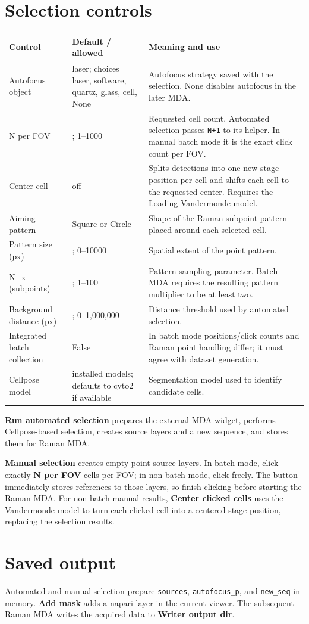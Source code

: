 \documentclass[11pt,oneside]{report}
\makeatletter
\newcommand{\ui}[1]{\textbf{#1}}
\newcommand{\code}[1]{\texttt{#1}}
\newcommand{\fieldtable}{\begin{longtable}{@{}>{\raggedright\arraybackslash}p{0.25\textwidth}>{\raggedright\arraybackslash}p{0.18\textwidth}>{\raggedright\arraybackslash}p{0.50\textwidth}@{}}\toprule\textbf{Control} & \textbf{Default / allowed} & \textbf{Meaning and use}\\\midrule\endhead}
\newcommand{\endfieldtable}{\bottomrule\end{longtable}}
\makeatother
\begin{document}
\section{Selection controls}
\fieldtable
Autofocus object & laser; choices laser, software, quartz, glass, cell, None &
Autofocus strategy saved with the selection. None disables autofocus in the later MDA.\\
N per FOV & 6; 1--1000 & Requested cell count. Automated selection passes
\code{N+1} to its helper. In manual batch mode it is the exact click count per FOV.\\
Center cell & off & Splits detections into one new stage position per cell and shifts
each cell to the requested center. Requires the Loading Vandermonde model.\\
Aiming pattern & Square or Circle & Shape of the Raman subpoint pattern placed around
each selected cell.\\
Pattern size (px) & 30; 0--10000 & Spatial extent of the point pattern.\\
N\_x (subpoints) & 1; 1--100 & Pattern sampling parameter. Batch MDA requires the
resulting pattern multiplier to be at least two.\\
Background distance (px) & 80; 0--1,000,000 & Distance threshold used by automated selection.\\
Integrated batch collection & False & In batch mode positions/click counts and Raman
point handling differ; it must agree with dataset generation.\\
Cellpose model & installed models; defaults to cyto2 if available & Segmentation model
used to identify candidate cells.\\
\endfieldtable

\ui{Run automated selection} prepares the external MDA widget, performs Cellpose-based
selection, creates source layers and a new sequence, and stores them for Raman MDA.

\ui{Manual selection} creates empty point-source layers. In batch mode, click exactly
\ui{N per FOV} cells per FOV; in non-batch mode, click freely. The button immediately
stores references to those layers, so finish clicking before starting the Raman MDA.
For non-batch manual results, \ui{Center clicked cells} uses the Vandermonde model to
turn each clicked cell into a centered stage position, replacing the selection results.

\section*{Saved output}
Automated and manual selection prepare \code{sources}, \code{autofocus\_p}, and
\code{new\_seq} in memory. \ui{Add mask} adds a napari layer in the current viewer.
The subsequent Raman MDA writes the acquired data to \ui{Writer output dir}.
\end{document}
